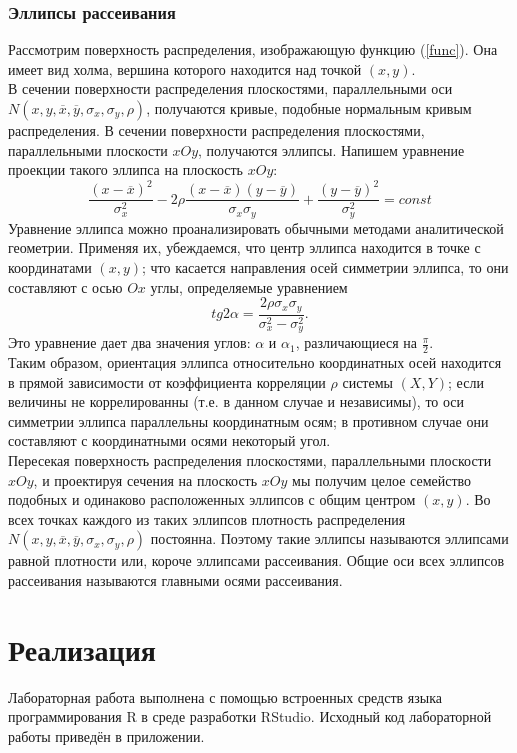 \subsubsection{Эллипсы рассеивания}
Рассмотрим поверхность распределения, изображающую функцию (\ref{func}). Она имеет вид холма, вершина которого находится над точкой $(x, y)$.\\
В сечении поверхности распределения плоскостями, параллельными оси $N(x, y, \overline{x}, \overline{y}, \sigma_x, \sigma_y, \rho)$, получаются кривые, подобные нормальным кривым распределения. В сечении поверхности распределения плоскостями, параллельными плоскости $xOy$, получаются эллипсы. Напишем уравнение проекции такого эллипса на плоскость $xOy$:
\begin{equation}
\frac{(x-\overline{x})^2}{\sigma_x^2}-2\rho\frac{(x-\overline{x})(y-\overline{y})}{\sigma_x \sigma_y}+\frac{(y-\overline{y})^2}{\sigma_y^2}=const
\end{equation}
Уравнение эллипса можно проанализировать обычными методами аналитической геометрии. Применяя их, убеждаемся, что центр эллипса находится в точке с координатами $(x, y)$; что касается направления осей симметрии эллипса, то они составляют с осью $Ox$ углы, определяемые уравнением
\begin{equation}
tg 2\alpha=\frac{2\rho \sigma_x \sigma_y}{\sigma_x^2-\sigma_y^2}.
\end{equation}
Это уравнение дает два значения углов: $\alpha$ и $\alpha_1$, различающиеся на $\frac{\pi}{2}$.\\
Таким образом, ориентация эллипса относительно координатных осей находится в прямой зависимости от коэффициента корреляции $\rho$ системы $(X, Y)$; если величины не коррелированны (т.е. в данном случае и независимы), то оси симметрии эллипса параллельны координатным осям; в противном случае они составляют с координатными осями некоторый угол.\\
Пересекая поверхность распределения плоскостями, параллельными плоскости $xOy$, и проектируя сечения на плоскость $xOy$ мы получим целое семейство подобных и одинаково расположенных эллипсов с общим центром $(x, y)$. Во всех точках каждого из таких эллипсов плотность распределения $N(x, y, \overline{x}, \overline{y}, \sigma_x, \sigma_y, \rho)$ постоянна. Поэтому такие эллипсы называются эллипсами равной плотности или, короче эллипсами рассеивания. Общие оси всех эллипсов рассеивания называются главными осями рассеивания.

\section{Реализация}
Лабораторная работа выполнена с помощью встроенных средств языка программирования R в среде разработки RStudio. Исходный код лабораторной работы приведён в приложении.

